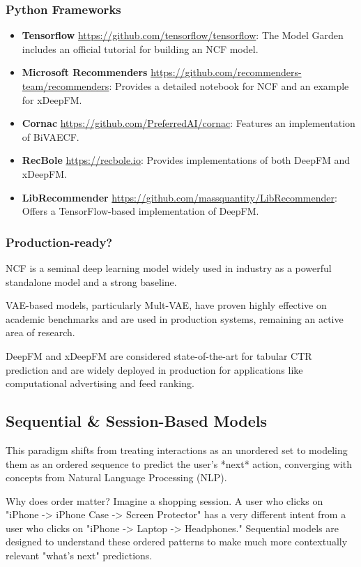 \documentclass{article}
\begin{document}
    \subsubsection*{Python Frameworks}
    \begin{itemize}
        \item \textbf{Tensorflow} \url{https://github.com/tensorflow/tensorflow}: The Model Garden includes an official tutorial for building an NCF model.
        \item \textbf{Microsoft Recommenders} \url{https://github.com/recommenders-team/recommenders}: Provides a detailed notebook for NCF and an example for xDeepFM.
        \item \textbf{Cornac} \url{https://github.com/PreferredAI/cornac}: Features an implementation of BiVAECF.
        \item \textbf{RecBole} \url{https://recbole.io}: Provides implementations of both DeepFM and xDeepFM.
        \item \textbf{LibRecommender} \url{https://github.com/massquantity/LibRecommender}: Offers a TensorFlow-based implementation of DeepFM.
    \end{itemize}
    
    \subsubsection*{Production-ready?}
    NCF is a seminal deep learning model widely used in industry as a powerful standalone model and a strong baseline.

    VAE-based models, particularly Mult-VAE, have proven highly effective on academic benchmarks and are used in production systems, remaining an active area of research.

    DeepFM and xDeepFM are considered state-of-the-art for tabular CTR prediction and are widely deployed in production for applications like computational advertising and feed ranking.
    
    \subsection{Sequential \& Session-Based Models}
    This paradigm shifts from treating interactions as an unordered set to modeling them as an ordered sequence to predict the user's *next* action, converging with concepts from Natural Language Processing (NLP).
    
    \begin{asidebox}{Why does order matter?}
    Imagine a shopping session. A user who clicks on "iPhone -> iPhone Case -> Screen Protector" has a very different intent from a user who clicks on "iPhone -> Laptop -> Headphones." Sequential models are designed to understand these ordered patterns to make much more contextually relevant "what's next" predictions.
    \end{asidebox}
\end{document}
